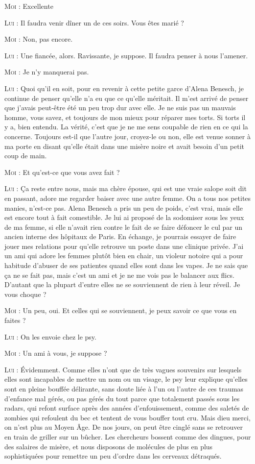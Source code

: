 \begin{dialogue}
\textsc{Moi} : Excellente

\textsc{Lui} : Il faudra venir dîner un de ces soirs. Vous êtes marié ?

\textsc{Moi} : Non, pas encore.

\textsc{Lui} : Une fiancée, alors. Ravissante, je suppose. Il faudra penser à nous l’amener.

\textsc{Moi} : Je n’y manquerai pas.

\textsc{Lui} : Quoi qu’il en soit, pour en revenir à cette petite garce d’Alena Benesch, je continue de penser qu’elle n’a eu que ce qu’elle méritait. Il m’est arrivé de penser que j’avais peut-être été un peu trop dur avec elle. Je ne suis pas un mauvais homme, vous savez, et toujours de mon mieux pour réparer mes torts. Si torts il y a, bien entendu. La vérité, c’est que je ne me sens coupable de rien en ce qui la concerne. Toujours est-il que l’autre jour, croyez-le ou non, elle est venue sonner à ma porte en disant qu’elle était dans une misère noire et avait besoin d’un petit coup de main.

\textsc{Moi} : Et qu’est-ce que vous avez fait ?

\textsc{Lui} : Ça reste entre nous, mais ma chère épouse, qui est une vraie salope soit dit en passant, adore me regarder baiser avec une autre femme. On a tous nos petites manies, n’est-ce pas. Alena Benesch a pris un peu de poids, c’est vrai, mais elle est encore tout à fait comestible. Je lui ai proposé de la sodomiser sous les yeux de ma femme, si elle n’avait rien contre le fait de se faire défoncer le cul par un ancien interne des hôpitaux de Paris. En échange, je pourrais essayer de faire jouer mes relations pour qu’elle retrouve un poste dans une clinique privée. J’ai un ami qui adore les femmes plutôt bien en chair, un violeur notoire qui a pour habitude d’abuser de ses patientes quand elles sont dans les vapes. Je ne sais que ça ne se fait pas, mais c’est un ami et je ne me vois pas le balancer aux flics. D’autant que la plupart d’entre elles ne se souviennent de rien à leur réveil. Je vous choque ?

\textsc{Moi} : Un peu, oui. Et celles qui se souviennent, je peux savoir ce que vous en faites ?

\textsc{Lui} : On les envoie chez le psy.

\textsc{Moi} : Un ami à vous, je suppose ?

\textsc{Lui} : Évidemment. Comme elles n’ont que de très vagues souvenirs sur lesquels elles sont incapables de mettre un nom ou un visage, le psy leur explique qu’elles sont en pleine bouffée délirante, sans doute liée à l’un ou l’autre de ces traumas d’enfance mal gérés, ou pas gérés du tout parce que totalement passés sous les radars, qui refont surface après des années d’enfouissement, comme des saletés de zombies qui refoulent du bec et tentent de vous bouffer tout cru. Mais dieu merci, on n’est plus au Moyen Âge. De nos jours, on peut être cinglé sans se retrouver en train de griller sur un bûcher. Les chercheurs bossent comme des dingues, pour des salaires de misère, et nous disposons de molécules de plus en plus sophistiquées pour remettre un peu d’ordre dans les cerveaux détraqués.


\end{dialogue}

